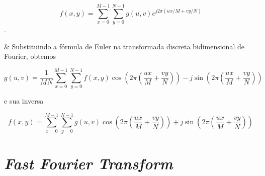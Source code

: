 \begin{easylist}
  \[ f(x, y) =             \sum^{M-1}_{x=0}\sum^{N-1}_{y=0} g(u, v) e^{ j2\pi (ux/M + vy/N)} \].

\clearpage
  
  & Substituindo a fórmula de Euler na transformada discreta bidimensional de Fourier, obtemos

  \[ g(u, v) = \frac 1{MN} \sum^{M-1}_{x=0}\sum^{N-1}_{y=0} f(x, y)
      \cos\left(2\pi \left(\frac{ux}{M} + \frac{vy}{N}\right)\right) -
     j\sin\left(2\pi \left(\frac{ux}{M} + \frac{vy}{N}\right)\right)   \]

  e sua inversa

  \[ f(x, y) =             \sum^{M-1}_{x=0}\sum^{N-1}_{y=0} g(u, v)
      \cos\left(2\pi \left(\frac{ux}{M} + \frac{vy}{N}\right)\right) +
     j\sin\left(2\pi \left(\frac{ux}{M} + \frac{vy}{N}\right)\right)   \]

\end{easylist}
  
\section{\textit{Fast Fourier Transform}}

